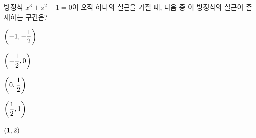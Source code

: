 방정식 $x^3+x^2-1=0$이 오직 하나의 실근을 가질 때, 다음 중 이 방정식의 실근이 존재하는 구간은?
\begin{choices32}{\rule[-3ex]{0pt}{8ex}$\left(-1{,}\mkern3mu\mathopen{}-\dfrac{1}{2}\right)$}{\rule[-3ex]{0pt}{8ex}$\left(-\dfrac{1}{2}{,}\mkern3mu\mathopen{}0\right)$}{\rule[-3ex]{0pt}{8ex}$\left(0{,}\mkern3mu\mathopen{}\dfrac{1}{2}\right)$}{\rule[-3ex]{0pt}{8ex}$\left(\dfrac{1}{2}{,}\mkern3mu\mathopen{}1\right)$}{\rule[-3ex]{0pt}{8ex}$(1{,}\mkern3mu\mathopen{}2)$}\end{choices32}
